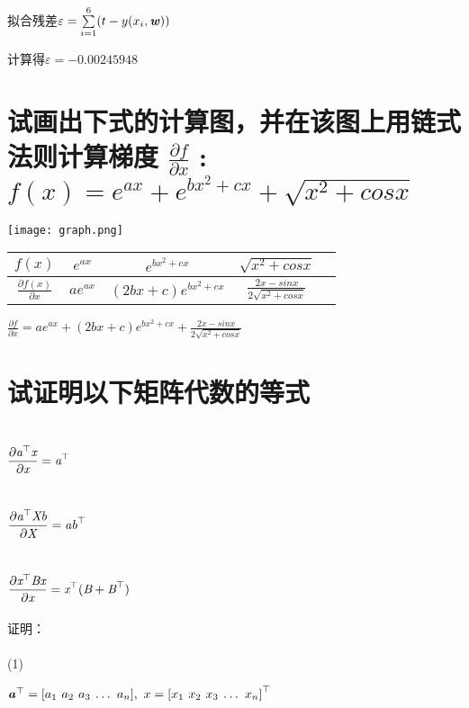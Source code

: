 \documentclass[UTF8]{ctexart}
\begin{document}
拟合残差$\varepsilon =\sum\limits_{i=1}\limits^6 (t-y(x_{i},\textbf{\emph{w}}))$

计算得$\varepsilon=-0.00245948$

\section{试画出下式的计算图，并在该图上用链式法则计算梯度
$\frac{ \partial f }{ \partial x }$ :
$f(x)=e^{ax}+e^{bx^2+cx}+\sqrt{x^2+cosx}$}
\texttt{[image: graph.png]}
\begin{table}[!h]
  \renewcommand{\arraystretch}{1.2}
  \label{table_example}
  \centering
  \begin{tabular}{c|c c c c}
    \hline
    $f(x) $                            & $e^{ax} $ & $e^{bx^2+cx}$        & $\sqrt{x^2+cosx}$                  \\
    \hline
    $\frac{\partial f(x)}{\partial x}$ & $ae^{ax}$ & $(2bx+c)e^{bx^2+cx}$ & $\frac{2x-sinx}{2\sqrt{x^2+cosx}}$ \\
    \hline
  \end{tabular}
\end{table}

$\frac{ \partial f }{ \partial x }=ae^{ax}+(2bx+c)e^{bx^2+cx}+\frac{2x-sinx}{2\sqrt{x^2+cosx}}$


\section{试证明以下矩阵代数的等式
  \\
  \\
  $\displaystyle{\frac{ \partial \mathbf{\emph {a}}^\top  \emph {x}  }{ \partial \emph {x} }=\mathbf{\emph {a}}^\top }$
  \\
  \\
  $\displaystyle{\frac{ \partial \mathbf{\emph {a}}^\top  \emph {Xb}  }{ \partial \emph {X} }=\emph {a}\mathbf{\emph {b}}^\top }$
  \\
  \\
  $\displaystyle{\frac{ \partial \mathbf{\emph{x}}^\top  \emph {Bx}  }{ \partial \emph {x} }=\mathbf{\emph{x}}^\top (\emph {B}+\mathbf{\emph{B}}^\top)}$
  \\
 }
证明：
\\
\\
(1)

$\mathbf{\textbf {\emph{a}}}^\top=[\emph {$a_{1}$\ $a_{2}$\ $a_{3}$\ …\ $a_{n}$}],
  \ x=\mathbf{[\emph {$x_{1}$\ $x_{2}$\ $x_{3}$\ …\ $x_{n}$}]}^\top$
\end{document}
